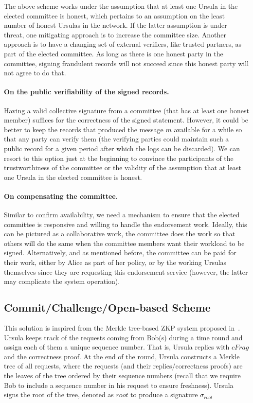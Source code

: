 The above scheme works under the assumption that at least one Ursula in the elected committee is honest, which pertains to an assumption on the least number of honest Ursulas in the network. If the latter assumption is under threat, one mitigating approach is to increase the committee size. Another approach is to have a changing set of external verifiers, like trusted partners, as part of the elected committee. As long as there is one honest party in the committee, signing fraudulent records will not succeed since this honest party will not agree to do that.


\paragraph{\bf On the public verifiability of the signed records.} 
Having a valid collective signature from a committee (that has at least one honest member) suffices for the correctness of the signed statement. However, it could be better to keep the records that produced the message $m$ available for a while so that any party can verify them (the verifying parties could maintain such a public record for a given period after which the logs can be discarded). We can resort to this option just at the beginning to convince the participants of the trustworthiness of the committee or the validity of the assumption that at least one Ursula in the elected committee is honest. 


\paragraph{\bf On compensating the committee.} 
Similar to confirm availability, we need a mechanism to ensure that the elected committee is responsive and willing to handle the endorsement work. Ideally, this can be pictured as a collaborative work, the committee does the work so that others will do the same when the committee members want their workload to be signed. Alternatively, and as mentioned before, the committee can be paid for their work, either by Alice as part of her policy, or by the working Ursulas themselves since they are requesting this endorsement service (however, the latter may complicate the system operation).


\subsection{Commit/Challenge/Open-based Scheme}
This solution is inspired from the Merkle tree-based ZKP system proposed in~\cite{dottling19}. Ursula keeps track of the requests coming from Bob(s) during a time round and assign each of them a unique sequence number. That is, Ursula replies with $cFrag$ and the correctness proof. At the end of the round, Ursula constructs a Merkle tree of all requests, where the requests (and their replies/correctness proofs) are the leaves of the tree ordered by their sequence numbers (recall that we require Bob to include a sequence number in his request to ensure freshness). Ursula signs the root of the tree, denoted as $root$ to produce a signature $\sigma_{root}$


